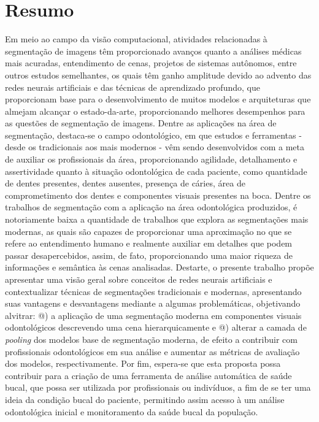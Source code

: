 \section*{Resumo}
\makeatletter
\newcommand*{\rom}[1]{\expandafter\@slowromancap\romannumeral #1@}
\makeatother
Em meio ao campo da visão computacional, atividades relacionadas à segmentação de imagens têm proporcionado avanços quanto a análises médicas mais acuradas, entendimento de cenas, projetos de sistemas autônomos, entre outros estudos semelhantes, os quais têm ganho amplitude devido ao advento das redes neurais artificiais e das técnicas de aprendizado profundo, que proporcionam base para o desenvolvimento de muitos modelos e arquiteturas que almejam alcançar o estado-da-arte, proporcionando melhores desempenhos para as questões de segmentação de imagens.
Dentre as aplicações na área de segmentação, destaca-se o campo odontológico, em que estudos e ferramentas - desde os tradicionais aos mais modernos - vêm sendo desenvolvidos com a meta de auxiliar os profissionais da área, proporcionando agilidade, detalhamento e assertividade quanto à situação odontológica de cada paciente, como quantidade de dentes presentes, dentes ausentes, presença de cáries, área de comprometimento dos dentes e componentes visuais presentes na boca. 
Dentre os trabalhos de segmentação com a aplicação na área odontológica produzidos, é notoriamente baixa a quantidade de trabalhos que explora as segmentações mais modernas, as quais são capazes de proporcionar uma aproximação no que se refere ao entendimento humano e realmente auxiliar em detalhes que podem passar desapercebidos, assim, de fato, proporcionando uma maior riqueza de informações e semântica às cenas analisadas.
Destarte, o presente trabalho propõe apresentar uma visão geral sobre conceitos de redes neurais artificiais e contextualizar técnicas de segmentações tradicionais e modernas, apresentando suas vantagens e desvantagens mediante a algumas problemáticas, objetivando alvitrar: \rom{1}) a aplicação de uma segmentação moderna em componentes visuais odontológicos descrevendo uma cena hierarquicamente e \rom{2}) alterar a camada de \textit{pooling} dos modelos base de segmentação moderna, de efeito a contribuir com profissionais odontológicos em sua análise e aumentar as métricas de avaliação dos modelos, respectivamente.
Por fim, espera-se que esta proposta possa contribuir para a criação de uma ferramenta de análise automática de saúde bucal, que possa ser utilizada por profissionais ou indivíduos, a fim de se ter uma ideia da condição bucal do paciente, permitindo assim acesso à um análise odontológica inicial e monitoramento da saúde bucal da população.
